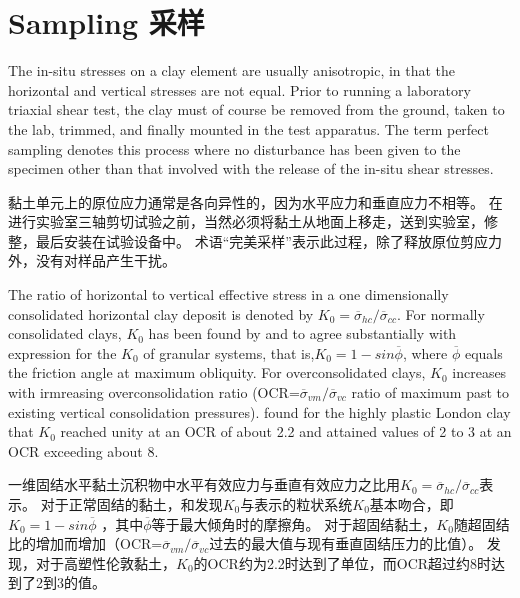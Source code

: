 \section{Sampling 采样}


\begin{paracol}{2}
    
    The in-situ stresses on a clay element are usually anisotropic, in that the horizontal and vertical stresses are not equal. Prior to running a laboratory triaxial shear test, the clay must of course be removed from the ground, taken to the lab, trimmed, and finally mounted in the test apparatus. The term perfect sampling denotes this process where no disturbance has been given to the specimen other than that involved with the release of the in-situ shear stresses.

    \switchcolumn

    黏土单元上的原位应力通常是各向异性的，因为水平应力和垂直应力不相等。 在进行实验室三轴剪切试验之前，当然必须将黏土从地面上移走，送到实验室，修整，最后安装在试验设备中。 术语“完美采样”表示此过程，除了释放原位剪应力外，没有对样品产生干扰。

    \switchcolumn*

    The ratio of horizontal to vertical effective stress in a one dimensionally consolidated horizontal clay deposit is denoted by $K_0=\overline\sigma_{hc}/\overline\sigma_{cc}$. For normally consolidated clays, $K_0$ has been found by \citet{Bishop19582} and \citet{Simons1958} to agree substantially with \citet{Jaky1948103} expression for the $K_0$ of granular systems, that is,$K_0 = 1-sin\overline{\phi}$, where $\overline{\phi}$ equals the friction angle at maximum obliquity. For overconsolidated clays, $K_0$ increases with irmreasing overconsolidation ratio (OCR=$\overline\sigma_{vm}/\overline\sigma_{vc}$ ratio of maximum past to existing vertical consolidation pressures).  \citet{Skempton1961351}  found for the highly plastic London clay that $K_0$ reached unity at an OCR of about 2.2 and attained values of 2 to 3 at an OCR exceeding about 8.

    \switchcolumn

    一维固结水平黏土沉积物中水平有效应力与垂直有效应力之比用$K_0=\overline\sigma_{hc}/\overline\sigma_{cc}$表示。 对于正常固结的黏土，\citet{Bishop19582}和\citet{Simons1958}发现$K_0$与\citet{Jaky1948103}表示的粒状系统$K_0$基本吻合，即$K_0 = 1-sin\overline{\phi}$  ，其中$\overline{\phi}$等于最大倾角时的摩擦角。 对于超固结黏土，$K_0$随超固结比的增加而增加（OCR=$\overline\sigma_{vm}/\overline\sigma_{vc}$过去的最大值与现有垂直固结压力的比值）。 \citet{Skempton1961351} 发现，对于高塑性伦敦黏土，$K_0$的OCR约为2.2时达到了单位，而OCR超过约8时达到了2到3的值。


\end{paracol}

